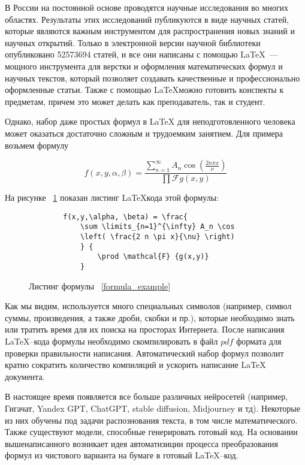 \introduction %

В России на постоянной основе проводятся научные исследования во многих областях. Результаты этих исследований публикуются в виде научных статей, которые являются важным инструментом для распространения новых знаний и научных открытий.
Только в электронной версии научной библиотеки опубликовано 52573694 \cite{eLib} статей, и все они написаны с помощью \LaTeX ~--- мощного инструмента для верстки и оформления математических формул и научных текстов, который позволяет создавать качественные и профессионально оформленные статьи. 
Также с помощью \LaTeX \quad можно готовить конспекты к предметам, причем это может делать как преподаватель, так и студент.

Однако, набор даже простых формул в LaTeX для неподготовленного человека может оказаться достаточно сложным и трудоемким занятием.
Для примера возьмем формулу

\begin{equation}
    \label{formula_example}
        f(x,y,\alpha, \beta) = \frac{\sum \limits_{n=1}^{\infty} 
        A_n \cos \left( \frac{2 n \pi x}{\nu} \right)} {\prod \mathcal{F} {g(x,y)} } 
\end{equation}

На рисунке ~\ref{formula_listing} показан листинг \LaTeX \quad кода этой формулы:

\begin{figure}
    \begin{lstlisting}
        f(x,y,\alpha, \beta) = \frac{
            \sum \limits_{n=1}^{\infty} A_n \cos 
            \left( \frac{2 n \pi x}{\nu} \right)
            } {
                \prod \mathcal{F} {g(x,y)} 
            } 
    \end{lstlisting}
    \caption{Листинг формулы ~\ref{formula_example}}
    \label{formula_listing}
\end{figure}

Как мы видим, используется много специальных символов (например, символ суммы, произведения, а также дроби, скобки и пр.), которые необходимо знать или тратить время для их поиска на просторах Интернета. 
После написания \LaTeX --кода формулы необходимо скомпилировать в файл $pdf$ формата для проверки правильности написания. Автоматический набор формул позволит кратно сократить количество компиляций и ускорить написание \LaTeX\; документа. 

В настоящее время появляется все больше различных нейросетей (например, Гигачат, Yandex GPT, ChatGPT, stable diffusion, Midjourney и тд). Некоторые из них обучены под задачи распознования текста, в том числе математического. Также существуют модели, способные генерировать готовый код. 
На основании вышенаписанного возникает идея автоматизиции процесса преобразования формул из чистового варианта на бумаге в готовый  \LaTeX --код.

